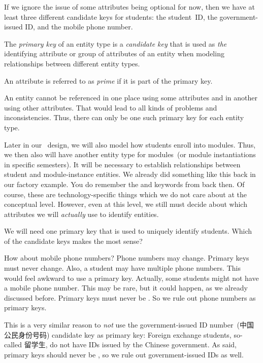 If we ignore the issue of some attributes being optional for now, then we have at least three different candidate keys for students:
the student~ID, the government-issued ID, and the mobile phone number.%
%
\begin{definition}%
\label{def:primaryKey}%
The \emph{primary key} of an entity type is a \emph{candidate key} that is used as \emph{the} identifying attribute or group of attributes of an entity when modeling relationships between different entity types.%
\end{definition}%
%
\begin{definition}%
An attribute is referred to as \emph{prime} if it is part of the primary key.%
\end{definition}%
%
An entity cannot be referenced in one place using some attributes and in another using other attributes.
That would lead to all kinds of problems and inconsistencies.
Thus, there can only be one such primary key for each entity type.

Later in our \db\ design, we will also model how students enroll into modules.
Thus, we then also will have another entity type for modules~(or module instantiations in specific semesters).
It will be necessary to establish relationships between student and module-instance entities.
We already did something like this back in our factory example.
You do remember the  and  keywords from back then.
Of course, these are technology-specific things which we do not care about at the conceptual level.
However, even at this level, we still must decide about which attributes we will \emph{actually} use to identify entities.

We will need one primary key that is used to uniquely identify students.
Which of the candidate keys makes the most sense?

How about mobile phone numbers?
Phone numbers may change.
Primary keys must never change.
Also, a student may have multiple phone numbers.
This would feel awkward to use a primary key.
Actually, some students might not have a mobile phone number.
This may be rare, but it could happen, as we already discussed before.
Primary keys must never be .
So we rule out phone numbers as primary keys.

This is a very similar reason to \emph{not} use the government-issued ID number~(中国公民身份号码\cite{GB116431999CIN}) candidate key as primary key:
Foreign exchange students, so-called 留学生, do not have IDs issued by the Chinese government.
As said, primary keys should never be , so we rule out government-issued IDs as well.

